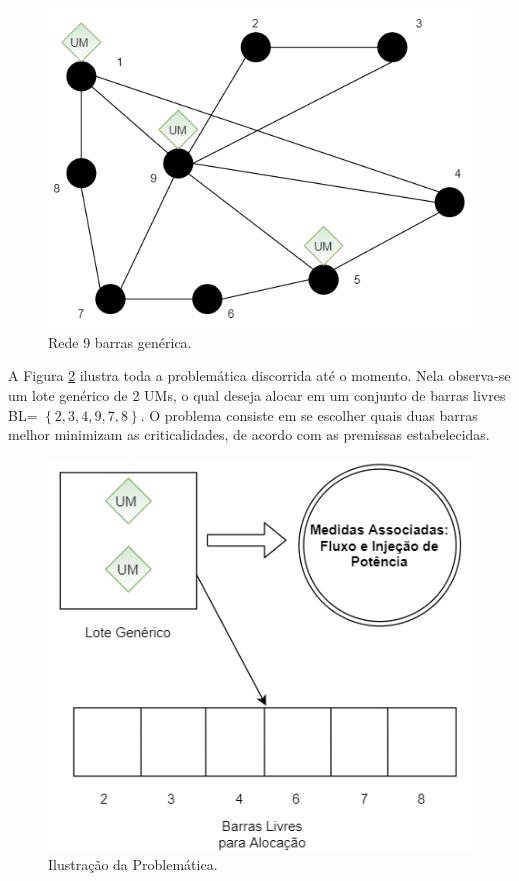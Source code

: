 \documentclass[12pt]{article}
\begin{document}
	\begin{figure}[H]
		\centering 
		\includegraphics[scale=0.8]{figuras/Rede9_gen.jpg}
		\caption{Rede 9 barras genérica.}
		\label{fig3} %
	\end{figure}

	A Figura \ref{fig4} ilustra toda a problemática discorrida até o momento. Nela observa-se um lote genérico de 2 UMs, o qual deseja alocar em um conjunto de barras livres BL= $\left \{ 2,3,4,9,7,8 \right \}$. O problema consiste em se escolher quais duas barras melhor  minimizam as criticalidades, de acordo com as premissas estabelecidas. 
	
	\begin{figure}[H]
		\centering 
		\includegraphics[scale=0.8]{figuras/UMs_aloc.jpg}
		\caption{Ilustração da Problemática.}
		\label{fig4} %
	\end{figure}
	
\end{document}
